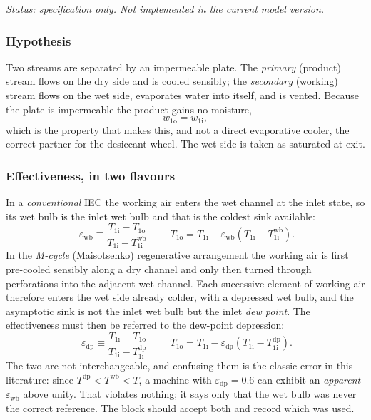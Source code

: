 \emph{Status: specification only. Not implemented in the current model version.}

\subsubsection{Hypothesis}
Two streams are separated by an impermeable plate. The \emph{primary} (product) stream flows on the
dry side and is cooled sensibly; the \emph{secondary} (working) stream flows on the wet side,
evaporates water into itself, and is vented. Because the plate is impermeable the product gains no
moisture,
\begin{equation}
w_{\mathrm{1o}} = w_{\mathrm{1i}} ,
\label{eq:spec:iecw}
\end{equation}
which is the property that makes this, and not a direct evaporative cooler, the correct partner for
the desiccant wheel. The wet side is taken as saturated at exit.

\subsubsection{Effectiveness, in two flavours}
In a \emph{conventional} IEC the working air enters the wet channel at the inlet state, so its wet
bulb is the inlet wet bulb and that is the coldest sink available:
\begin{equation}
\boxed{\;
\varepsilon_{\mathrm{wb}} \equiv
\frac{T_{\mathrm{1i}}-T_{\mathrm{1o}}}{T_{\mathrm{1i}}-T_{\mathrm{1i}}^{\mathrm{wb}}}\;}
\qquad
T_{\mathrm{1o}} = T_{\mathrm{1i}} - \varepsilon_{\mathrm{wb}}
 \left(T_{\mathrm{1i}}-T_{\mathrm{1i}}^{\mathrm{wb}}\right) .
\label{eq:spec:iecwb}
\end{equation}
In the \emph{M-cycle} (Maisotsenko) regenerative arrangement the working air is first pre-cooled
sensibly along a dry channel and only then turned through perforations into the adjacent wet channel.
Each successive element of working air therefore enters the wet side already colder, with a depressed
wet bulb, and the asymptotic sink is not the inlet wet bulb but the inlet \emph{dew point}. The
effectiveness must then be referred to the dew-point depression:
\begin{equation}
\boxed{\;
\varepsilon_{\mathrm{dp}} \equiv
\frac{T_{\mathrm{1i}}-T_{\mathrm{1o}}}{T_{\mathrm{1i}}-T_{\mathrm{1i}}^{\mathrm{dp}}}\;}
\qquad
T_{\mathrm{1o}} = T_{\mathrm{1i}} - \varepsilon_{\mathrm{dp}}
 \left(T_{\mathrm{1i}}-T_{\mathrm{1i}}^{\mathrm{dp}}\right) .
\label{eq:spec:iecdp}
\end{equation}
The two are not interchangeable, and confusing them is the classic error in this literature: since
$T^{\mathrm{dp}} < T^{\mathrm{wb}} < T$, a machine with $\varepsilon_{\mathrm{dp}}=0.6$ can exhibit an
\emph{apparent} $\varepsilon_{\mathrm{wb}}$ above unity. That violates nothing; it says only that the
wet bulb was never the correct reference. The block should accept both and record which was used.

